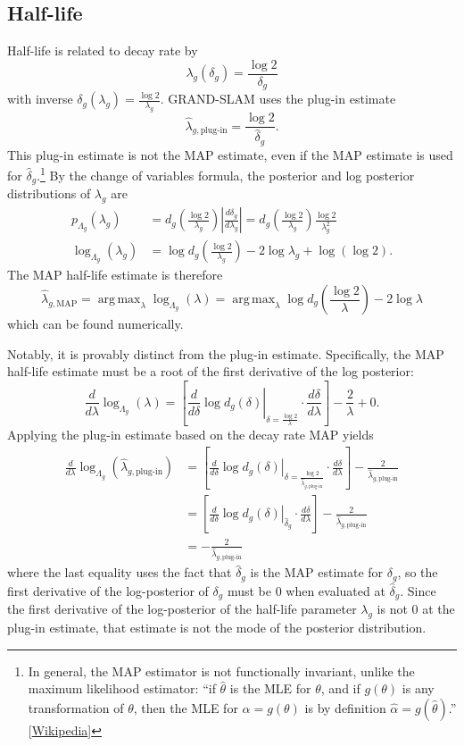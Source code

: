 \documentclass[11pt]{article}
\DeclareMathOperator*{\argmax}{arg\,max}
\begin{document}
\subsection{Half-life}

Half-life is related to decay rate by
$$\lambda_g(\delta_g) = \frac{\log 2}{\delta_g}$$
with inverse $\delta_g(\lambda_g) = \frac{\log 2}{\lambda_g}$. GRAND-SLAM uses the plug-in estimate
$$
\hat{\lambda}_{g, \text{plug-in}} = \frac{\log 2}{\hat{\delta}_g}.
$$
This plug-in estimate is not the MAP estimate, even if the MAP estimate is used for $\hat{\delta}_g$.\footnote{In general, the MAP estimator is not functionally invariant, unlike the maximum likelihood estimator: ``if $\hat{\theta}$ is the MLE for $\theta$, and if $g(\theta)$ is any transformation of $\theta$, then the MLE for $\alpha = g(\theta)$ is by definition $\hat{\alpha} = g(\hat{\theta})$.'' [\href{https://en.wikipedia.org/wiki/Maximum_likelihood_estimation\#Functional_invariance}{Wikipedia}]} By the change of variables formula, the posterior and log posterior distributions of $\lambda_g$ are
$$
\begin{aligned}
p_{\Lambda_g}(\lambda_g)
&= d_g\left(\frac{\log 2}{\lambda_g}\right) \left\lvert \frac{d\delta_g}{d\lambda_g} \right\rvert
= d_g\left(\frac{\log 2}{\lambda_g}\right) \frac{\log 2}{\lambda_g^2} \\
\log_{\Lambda_g}(\lambda_g) &= \log d_g\left(\frac{\log 2}{\lambda_g}\right) - 2 \log \lambda_g + \log(\log 2).
\end{aligned}
$$
The MAP half-life estimate is therefore
$$
\hat{\lambda}_{g, \text{MAP}}
= \argmax_\lambda \log_{\Lambda_g}(\lambda)
= \argmax_\lambda \log d_g\left(\frac{\log 2}{\lambda}\right) - 2 \log \lambda
$$
which can be found numerically.

Notably, it is provably distinct from the plug-in estimate. Specifically, the MAP half-life estimate must be a root of the first derivative of the log posterior:
$$
\frac{d}{d\lambda} \log_{\Lambda_g}(\lambda)
= \left[\left. \frac{d}{d\delta} \log d_g(\delta) \right|_{\delta = \frac{\log 2}{\lambda}} \cdot \frac{d \delta}{d \lambda} \right] - \frac{2}{\lambda} + 0.
$$
Applying the plug-in estimate based on the decay rate MAP yields
$$
\begin{aligned}
\frac{d}{d\lambda} \log_{\Lambda_g}(\hat{\lambda}_{g, \text{plug-in}})
&= \left[\left. \frac{d}{d\delta} \log d_g(\delta) \right|_{\delta = \frac{\log 2}{\hat{\lambda}_{g, \text{plug-in}}}} \cdot \frac{d \delta}{d \lambda} \right] - \frac{2}{\hat{\lambda}_{g, \text{plug-in}}} \\
&= \left[\left. \frac{d}{d\delta} \log d_g(\delta) \right|_{\hat{\delta}_g} \cdot \frac{d \delta}{d \lambda} \right] - \frac{2}{\hat{\lambda}_{g, \text{plug-in}}} \\
&= - \frac{2}{\hat{\lambda}_{g, \text{plug-in}}}
\end{aligned}
$$
where the last equality uses the fact that $\hat{\delta}_g$ is the MAP estimate for $\delta_g$, so the first derivative of the log-posterior of $\delta_g$ must be 0 when evaluated at $\hat{\delta}_g$. Since the first derivative of the log-posterior of the half-life parameter $\lambda_g$ is not 0 at the plug-in estimate, that estimate is not the mode of the posterior distribution.
\end{document}
